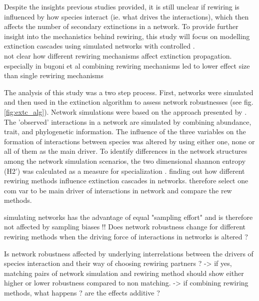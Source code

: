 \documentclass[12pt,a4paper]{article}
\begin{document}
Despite the insights previous studies provided, it is still unclear if rewiring is influenced by how species interact (ie. what drives the interactions), which then affects the number of secondary extinctions in a network. To provide further insight into the mechanistics behind rewiring, this study will focus on modelling extinction cascades using simulated networks with controlled . \\

	not clear how different rewiring mechanisms affect extinction propagation. especially in bugoni et al combining rewiring mechanisms led to lower effect size than single rewiring mechanisms

The analysis of this study was a two step process. First, networks were simulated and then used in the extinction algorithm to assess network robustnesses (see fig. \ref{fig:extc_alg}).  
Network simulations were based on the approach presented by \citeauthor{Benadi} \parencite{Benadi}. The 'observed' interactions in a network are simulated by combining abundance, trait, and phylogenetic information. The influence of the three variables on the formation of interactions between species was altered by using either one, none or all of them as the main driver.
To identify differences in the network structures among the network simulation scenarios, the two dimensional shannon entropy (H2') was calculated as a measure for specialization \parencite{Blüthgen2006}.
	finding out how different rewiring methods influence extinction cascades in networks. therefore select one com var to be main driver of interactions in network and compare the rew methods. 
	
	simulating networks has the advantage of equal "sampling effort" and is therefore not affected by sampling biases !!
Does network robustness change for different rewiring methods when the driving force of interactions in networks is altered ?

Is network robustness affected by underlying interrelations between the drivers of species interaction and their way of choosing rewiring partners ?
	-> if yes, matching pairs of network simulation and rewiring method should show either higher or lower robustness compared to non matching.
	-> if combining rewiring methods, what happens ? are the effects additive ?
\end{document}
